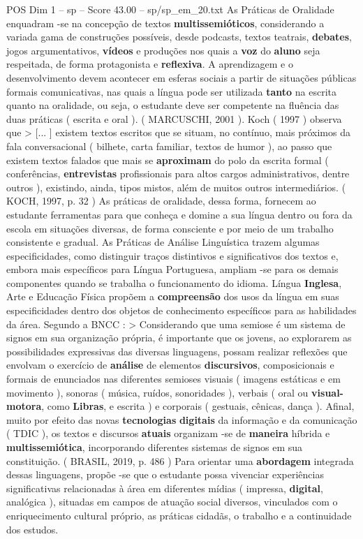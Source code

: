 \begin{textsample}{POS Dim 1 – sp – Score 43.00 – sp/sp\_em\_20.txt}
As Práticas de Oralidade enquadram -se na concepção de textos \textbf{multissemióticos}, considerando a variada gama de construções possíveis, desde podcasts, textos teatrais, \textbf{debates}, jogos argumentativos, \textbf{vídeos} e produções nos quais a \textbf{voz} do \textbf{aluno} seja respeitada, de forma protagonista e \textbf{reflexiva}.
A aprendizagem e o desenvolvimento devem acontecer em esferas sociais a partir de situações públicas formais comunicativas, nas quais a língua pode ser utilizada \textbf{tanto} na escrita quanto na oralidade, ou seja, o estudante deve ser competente na fluência das duas práticas ( escrita e oral ). ( MARCUSCHI, 2001 ).
Koch ( 1997 ) observa que > [... ] existem textos escritos que se situam, no contínuo, mais próximos da fala conversacional ( bilhete, carta familiar, textos de humor ), ao passo que existem textos falados que mais se \textbf{aproximam} do polo da escrita formal ( conferências, \textbf{entrevistas} profissionais para altos cargos administrativos, dentre outros ), existindo, ainda, tipos mistos, além de muitos outros intermediários. ( KOCH, 1997, p. 32 ) As práticas de oralidade, dessa forma, fornecem ao estudante ferramentas para que conheça e domine a sua língua dentro ou fora da escola em situações diversas, de forma consciente e por meio de um trabalho consistente e gradual.
As Práticas de Análise Linguística trazem algumas especificidades, como distinguir traços distintivos e significativos dos textos e, embora mais específicos para Língua Portuguesa, ampliam -se para os demais componentes quando se trabalha o funcionamento do idioma.
Língua \textbf{Inglesa}, Arte e Educação Física propõem a \textbf{compreensão} dos usos da língua em suas especificidades dentro dos objetos de conhecimento específicos para as habilidades da área.
Segundo a BNCC : > Considerando que uma semiose é um sistema de signos em sua organização própria, é importante que os jovens, ao explorarem as possibilidades expressivas das diversas linguagens, possam realizar reflexões que envolvam o exercício de \textbf{análise} de elementos \textbf{discursivos}, composicionais e formais de enunciados nas diferentes semioses visuais ( imagens estáticas e em movimento ), sonoras ( música, ruídos, sonoridades ), verbais ( oral ou \textbf{visual-motora}, como \textbf{Libras}, e escrita ) e corporais ( gestuais, cênicas, dança ).
Afinal, muito por efeito das novas \textbf{tecnologias} \textbf{digitais} da informação e da comunicação ( TDIC ), os textos e discursos \textbf{atuais} organizam -se de \textbf{maneira} híbrida e \textbf{multissemiótica}, incorporando diferentes sistemas de signos em sua constituição. ( BRASIL, 2019, p. 486 ) Para orientar uma \textbf{abordagem} integrada dessas linguagens, propõe -se que o estudante possa vivenciar experiências significativas relacionadas à área em diferentes mídias ( impressa, \textbf{digital}, analógica ), situadas em campos de atuação social diversos, vinculados com o enriquecimento cultural próprio, as práticas cidadãs, o trabalho e a continuidade dos estudos.

\end{textsample}
